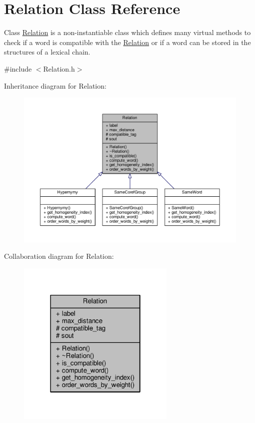 \hypertarget{classRelation}{}\section{Relation Class Reference}
\label{classRelation}


Class \hyperlink{classRelation}{Relation} is a non-\/instantiable class which defines many virtual methods to check if a word is compatible with the \hyperlink{classRelation}{Relation} or if a word can be stored in the structures of a lexical chain.  




{\ttfamily \#include $<$Relation.\+h$>$}



Inheritance diagram for Relation\+:
\nopagebreak
\begin{figure}[H]
\begin{center}
\leavevmode
\includegraphics[width=350pt]{classRelation__inherit__graph}
\end{center}
\end{figure}


Collaboration diagram for Relation\+:
\nopagebreak
\begin{figure}[H]
\begin{center}
\leavevmode
\includegraphics[width=214pt]{classRelation__coll__graph}
\end{center}
\end{figure}
